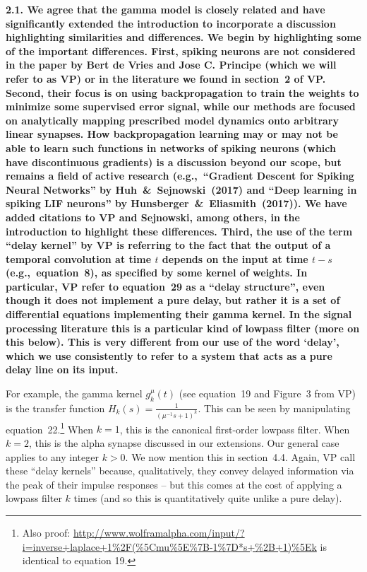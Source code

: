 \documentclass[a4paper]{article}
\newcommand{\newl}{\par\null\par}
\newcommand{\REPLY}[1]{\newl\begin{adjustwidth}{2em}{2em}{\bf #1}\end{adjustwidth}\newl}
\begin{document}
\REPLY{2.1. We agree that the gamma model is closely related and have significantly extended the introduction to incorporate a discussion highlighting similarities and differences. We begin by highlighting some of the important differences.
First, spiking neurons are not considered in the paper by Bert de Vries and Jose C. Principe (which we will refer to as VP) or in the literature we found in section~2 of VP.
Second, their focus is on using backpropagation to train the weights to minimize some supervised error signal, while our methods are focused on analytically mapping prescribed model dynamics onto arbitrary linear synapses.
How backpropagation learning may or may not be able to learn such functions in networks of spiking neurons (which have discontinuous gradients) is a discussion beyond our scope, but remains a field of active research (e.g.,~``Gradient Descent for Spiking Neural Networks'' by Huh~\&~Sejnowski~(2017) and ``Deep learning in spiking LIF neurons'' by Hunsberger~\&~Eliasmith~(2017)).
We have added citations to VP and Sejnowski, among others, in the introduction to highlight these differences.
Third, the use of the term ``delay kernel'' by VP is referring to the fact that the output of a temporal convolution at time $t$ depends on the input at time $t - s$ (e.g.,~equation~8), as specified by some kernel of weights.
In particular, VP refer to equation~29 as a ``delay structure'', even though it does not implement a pure delay, but rather it is a set of differential equations implementing their gamma kernel.
In the signal processing literature this is a particular kind of lowpass filter (more on this below).
This is very different from our use of the word `delay', which we use consistently to refer to a system that acts as a pure delay line on its input.
\newl
For example, the gamma kernel $g_k^\mu (t)$ (see equation~19 and Figure~3 from VP) is the transfer function $H_k(s) = \frac{1}{(\mu^{-1} s + 1)^k}$.
This can be seen by manipulating equation~22.\footnote{Also proof: \url{http://www.wolframalpha.com/input/?i=inverse+laplace+1\%2F(\%5Cmu\%5E\%7B-1\%7D*s+\%2B+1)\%5Ek} is identical to equation 19.}
When $k=1$, this is the canonical first-order lowpass filter.
When $k=2$, this is the alpha synapse discussed in our extensions.
Our general case applies to any integer $k > 0$.
We now mention this in section~4.4.
Again, VP call these ``delay kernels'' because, qualitatively, they convey delayed information via the peak of their impulse responses -- but this comes at the cost of applying a lowpass filter $k$ times (and so this is quantitatively quite unlike a pure delay).
}
\end{document}
